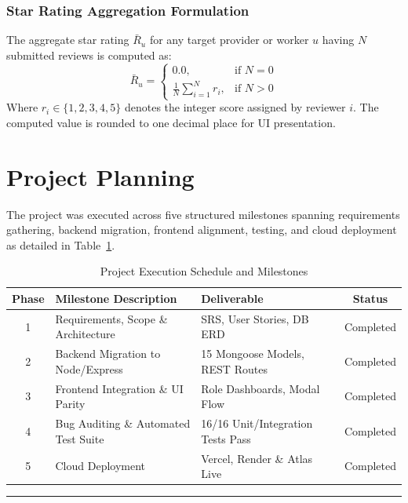 \subsubsection{Star Rating Aggregation Formulation}
The aggregate star rating $\bar{R}_u$ for any target provider or worker $u$ having $N$ submitted reviews is computed as:
\begin{equation}
\bar{R}_u = 
\begin{cases} 
0.0, & \text{if } N = 0 \\
\displaystyle\frac{1}{N}\sum_{i=1}^{N} r_i, & \text{if } N > 0 
\end{cases}
\end{equation}
Where $r_i \in \{1, 2, 3, 4, 5\}$ denotes the integer score assigned by reviewer $i$. The computed value is rounded to one decimal place for UI presentation.

\section{Project Planning}
The project was executed across five structured milestones spanning requirements gathering, backend migration, frontend alignment, testing, and cloud deployment as detailed in Table~\ref{tab:planning}.

\begin{table}[h!]
\centering
\caption{Project Execution Schedule and Milestones}\label{tab:planning}
\begin{tabular}{|c|l|l|c|}
\hline
\textbf{Phase} & \textbf{Milestone Description} & \textbf{Deliverable} & \textbf{Status} \\ \hline
1 & Requirements, Scope \& Architecture & SRS, User Stories, DB ERD & Completed \\ \hline
2 & Backend Migration to Node/Express & 15 Mongoose Models, REST Routes & Completed \\ \hline
3 & Frontend Integration \& UI Parity & Role Dashboards, Modal Flow & Completed \\ \hline
4 & Bug Auditing \& Automated Test Suite & 16/16 Unit/Integration Tests Pass & Completed \\ \hline
5 & Cloud Deployment & Vercel, Render \& Atlas Live & Completed \\ \hline
\end{tabular}
\end{table}

\vspace{10mm}
\hrule
